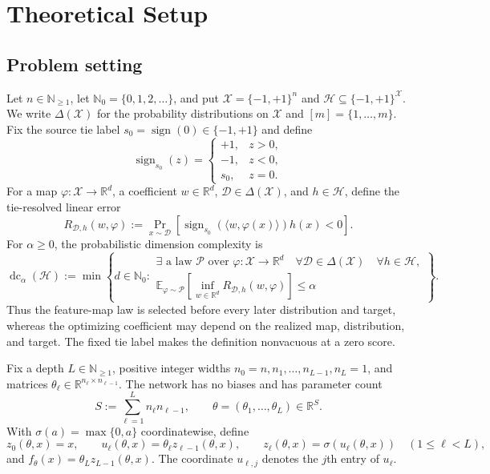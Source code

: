 \section{Theoretical Setup}
\label{sec:setup}

\subsection{Problem setting}

Let $n\in\mathbb N_{\geq1}$, let
$\mathbb N_0=\{0,1,2,\ldots\}$, and put
$\mathcal X=\{-1,+1\}^n$ and
$\mathcal H\subseteq\{-1,+1\}^{\mathcal X}$.  We write
$\Delta(\mathcal X)$ for the probability distributions on $\mathcal X$ and
$[m]=\{1,\ldots,m\}$.  Fix the source tie label
$s_0=\operatorname{sign}(0)\in\{-1,+1\}$ and define
\[
\operatorname{sign}_{s_0}(z)=
\begin{cases}
+1,&z>0,\\
-1,&z<0,\\
s_0,&z=0.
\end{cases}
\]
For a map $\varphi:\mathcal X\to\mathbb R^d$, a coefficient
$w\in\mathbb R^d$, $\mathcal D\in\Delta(\mathcal X)$, and
$h\in\mathcal H$, define the tie-resolved linear error
\[
R_{\mathcal D,h}(w,\varphi)
:=\Pr_{x\sim\mathcal D}\!\left[
\operatorname{sign}_{s_0}(\langle w,\varphi(x)\rangle)h(x)<0
\right].
\]
For $\alpha\geq0$, the probabilistic dimension complexity is
\[
\operatorname{dc}_{\alpha}(\mathcal H)
:=\min\left\{d\in\mathbb N_0:
\begin{array}{l}
\exists\text{ a law }\mathcal P\text{ over }
\varphi:\mathcal X\to\mathbb R^d\quad
\forall\mathcal D\in\Delta(\mathcal X)\quad\forall h\in\mathcal H,\\[1mm]
\displaystyle
\mathbb E_{\varphi\sim\mathcal P}\!\left[
\inf_{w\in\mathbb R^d}R_{\mathcal D,h}(w,\varphi)
\right]\leq\alpha
\end{array}
\right\}.
\tag{1}
\]
Thus the feature-map law is selected before every later distribution and
target, whereas the optimizing coefficient may depend on the realized map,
distribution, and target.  The fixed tie label makes the definition
nonvacuous at a zero score.

Fix a depth $L\in\mathbb N_{\geq1}$, positive integer widths
$n_0=n,n_1,\ldots,n_{L-1},n_L=1$, and matrices
$\theta_\ell\in\mathbb R^{n_\ell\times n_{\ell-1}}$.  The network has no
biases and has parameter count
\[
S:=\sum_{\ell=1}^{L}n_\ell n_{\ell-1},
\qquad
\theta=(\theta_1,\ldots,\theta_L)\in\mathbb R^S.
\tag{2}
\]
With $\sigma(a)=\max\{0,a\}$ coordinatewise, define
\[
z_0(\theta,x)=x,
\qquad
u_\ell(\theta,x)=\theta_\ell z_{\ell-1}(\theta,x),
\qquad
z_\ell(\theta,x)=\sigma(u_\ell(\theta,x))
\quad(1\leq\ell<L),
\]
and $f_\theta(x)=\theta_Lz_{L-1}(\theta,x)$.  The coordinate
$u_{\ell,j}$ denotes the $j$th entry of $u_\ell$.

